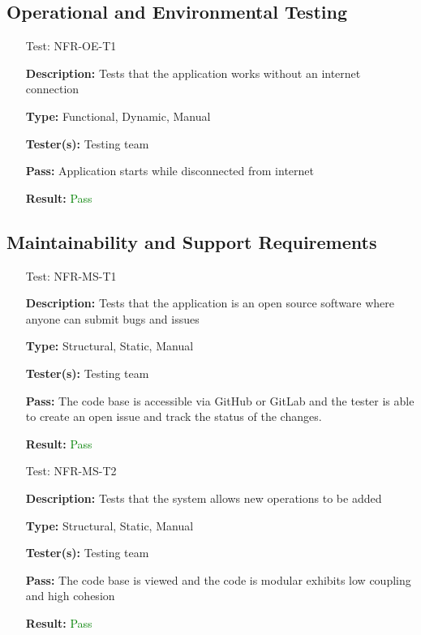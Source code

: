 \documentclass[12pt, titlepage]{article}
\begin{document}
\subsection{Operational and Environmental Testing}
\begin{enumerate}
    
\item[Test:]{NFR-OE-T1\\}

\textbf{Description:} Tests that the application works without an internet connection

\textbf{Type:} Functional, Dynamic, Manual

\textbf{Tester(s):} Testing team

\textbf{Pass:} Application starts while disconnected from internet
					
\textbf{Result:} \textcolor{Green}{Pass}


\end{enumerate}

\subsection{Maintainability and Support Requirements}

\begin{enumerate}
\item[Test:]{NFR-MS-T1\\}

\textbf{Description:} Tests that the application is an open source software where anyone can submit bugs and issues

\textbf{Type:} Structural, Static, Manual
					
\textbf{Tester(s):} Testing team
					
\textbf{Pass:} The code base is accessible via GitHub or GitLab and the tester is able to create an open issue and track the status of the changes.  
					
\textbf{Result:} \textcolor{Green}{Pass}

\item[Test:]{NFR-MS-T2\\}

\textbf{Description:} Tests that the system allows new operations to be added

\textbf{Type:} Structural, Static, Manual
					
\textbf{Tester(s):} Testing team
					
\textbf{Pass:} The code base is viewed and the code is modular exhibits low coupling and high cohesion
					
\textbf{Result:} \textcolor{Green}{Pass}

\end{enumerate}
\end{document}
